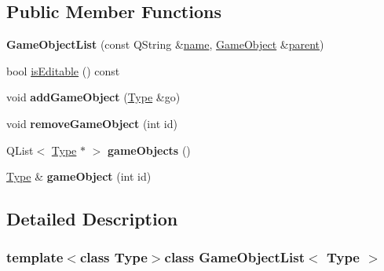 \subsection*{\-Public \-Member \-Functions}
\begin{DoxyCompactItemize}
\item 
\hypertarget{class_game_object_list_a7da0cfb657bebc815aa9c5d3d823f699}{{\bfseries \-Game\-Object\-List} (const \-Q\-String \&\hyperlink{class_game_object_aede5e0829a5fe107b1419bd62f03c132}{name}, \hyperlink{class_game_object}{\-Game\-Object} \&\hyperlink{class_game_object_af3deaf39cde23c189765634e32e95bb4}{parent})}\label{class_game_object_list_a7da0cfb657bebc815aa9c5d3d823f699}

\item 
bool \hyperlink{class_game_object_list_aea0e66416e9549f129b51ae9d1dfc238}{is\-Editable} () const 
\item 
\hypertarget{class_game_object_list_aeb6044a0ca44ad893cad2f42d75b9c91}{void {\bfseries add\-Game\-Object} (\hyperlink{class_type}{\-Type} \&go)}\label{class_game_object_list_aeb6044a0ca44ad893cad2f42d75b9c91}

\item 
\hypertarget{class_game_object_list_a6288e9d5c6910453e32108d589f85faf}{void {\bfseries remove\-Game\-Object} (int id)}\label{class_game_object_list_a6288e9d5c6910453e32108d589f85faf}

\item 
\hypertarget{class_game_object_list_af3bb0115f210be15c42e6c9c8a6a0e8a}{\-Q\-List$<$ \hyperlink{class_type}{\-Type} $\ast$ $>$ {\bfseries game\-Objects} ()}\label{class_game_object_list_af3bb0115f210be15c42e6c9c8a6a0e8a}

\item 
\hypertarget{class_game_object_list_a09c3802740e73e9d929da3ed04527d94}{\hyperlink{class_type}{\-Type} \& {\bfseries game\-Object} (int id)}\label{class_game_object_list_a09c3802740e73e9d929da3ed04527d94}

\end{DoxyCompactItemize}


\subsection{\-Detailed \-Description}
\subsubsection*{template$<$class Type$>$class Game\-Object\-List$<$ Type $>$}

